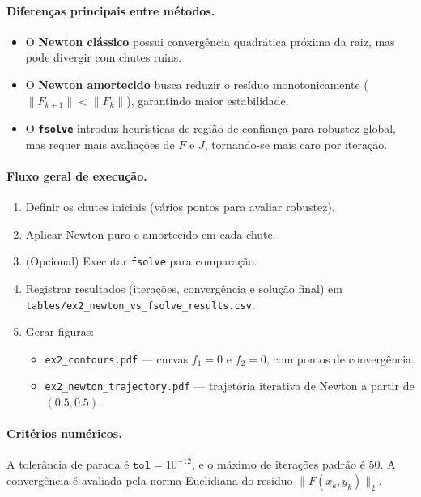 \documentclass[12pt,a4paper]{article}
\begin{document}
\paragraph{Diferenças principais entre métodos.}
\begin{itemize}
  \item O \textbf{Newton clássico} possui convergência quadrática próxima da raiz, mas pode divergir com chutes ruins.
  \item O \textbf{Newton amortecido} busca reduzir o resíduo monotonicamente (\(\|F_{k+1}\| < \|F_k\|\)), garantindo maior estabilidade.
  \item O \textbf{\texttt{fsolve}} introduz heurísticas de região de confiança para robustez global, mas requer mais avaliações de \(F\) e \(J\), tornando-se mais caro por iteração.
\end{itemize}

\paragraph{Fluxo geral de execução.}
\begin{enumerate}
  \item Definir os chutes iniciais (vários pontos para avaliar robustez).
  \item Aplicar Newton puro e amortecido em cada chute.
  \item (Opcional) Executar \texttt{fsolve} para comparação.
  \item Registrar resultados (iterações, convergência e solução final) em \texttt{tables/ex2\_newton\_vs\_fsolve\_results.csv}.
  \item Gerar figuras:
    \begin{itemize}
      \item \texttt{ex2\_contours.pdf} — curvas \(f_1=0\) e \(f_2=0\), com pontos de convergência.
      \item \texttt{ex2\_newton\_trajectory.pdf} — trajetória iterativa de Newton a partir de $(0.5,0.5)$.
    \end{itemize}
\end{enumerate}

\paragraph{Critérios numéricos.}
A tolerância de parada é \(\texttt{tol}=10^{-12}\), e o máximo de iterações padrão é 50. 
A convergência é avaliada pela norma Euclidiana do resíduo \(\|F(x_k,y_k)\|_2\).
\end{document}
